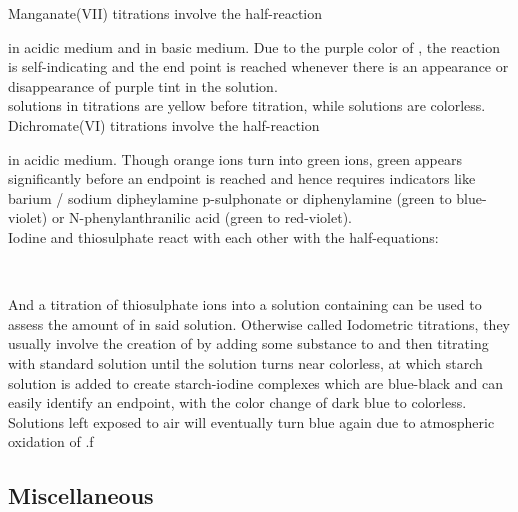 \documentclass[../main]{subfiles}
\begin{document}
	Manganate(VII) titrations involve the half-reaction 
	\begin{center} \end{center}
	in acidic medium and  in basic medium. Due to the purple color of , the reaction is self-indicating and the end point is reached whenever there is an appearance or disappearance of purple tint in the solution.\\

	 solutions in  titrations are yellow before titration, while  solutions are colorless. \\

	Dichromate(VI) titrations involve the half-reaction 
	\begin{center}  \end{center}
	in acidic medium. Though orange  ions turn into green  ions, green appears significantly before an endpoint is reached and hence requires indicators like barium / sodium dipheylamine p-sulphonate or diphenylamine (green to blue-violet) or N-phenylanthranilic acid (green to red-violet). \\

	Iodine and thiosulphate react with each other with the half-equations:

	\begin{center}
		 \\
	\end{center} 

	And a titration of thiosulphate ions into a solution containing  can be used to assess the amount of  in said solution. Otherwise called Iodometric titrations, they usually involve the creation of  by adding some substance to  and then titrating with standard  solution until the solution turns near colorless, at which starch solution is added to create starch-iodine complexes which are blue-black and can easily identify an endpoint, with the color change of dark blue to colorless. Solutions left exposed to air will eventually turn blue again due to atmospheric oxidation of .f

	\subsection{Miscellaneous}

\end{document}
